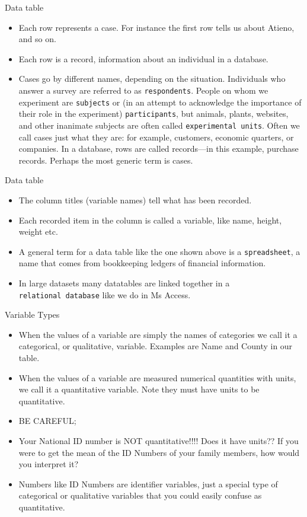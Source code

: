 \documentclass[
  ignorenonframetext,
]{beamer}
\begin{document}
\begin{frame}[fragile]{Data table}
\protect\hypertarget{data-table}{}
\begin{itemize}
\item
  Each row represents a case. For instance the first row tells us about
  Atieno, and so on.
\item
  Each row is a record, information about an individual in a database.
\item
  Cases go by different names, depending on the situation. Individuals
  who answer a survey are referred to as \texttt{respondents}. People on
  whom we experiment are \texttt{subjects} or (in an attempt to
  acknowledge the importance of their role in the experiment)
  \texttt{participants}, but animals, plants, websites, and other
  inanimate subjects are often called \texttt{experimental\ units}.
  Often we call cases just what they are: for example, customers,
  economic quarters, or companies. In a database, rows are called
  records---in this example, purchase records. Perhaps the most generic
  term is cases.
\end{itemize}
\end{frame}

\begin{frame}[fragile]{Data table}
\protect\hypertarget{data-table-1}{}
\begin{itemize}
\item
  The column titles (variable names) tell what has been recorded.
\item
  Each recorded item in the column is called a variable, like name,
  height, weight etc.
\item
  A general term for a data table like the one shown above is a
  \texttt{spreadsheet}, a name that comes from bookkeeping ledgers of
  financial information.
\item
  In large datasets many datatables are linked together in a
  \texttt{relational\ database} like we do in Ms Access.
\end{itemize}
\end{frame}

\begin{frame}{Variable Types}
\protect\hypertarget{variable-types}{}
\begin{itemize}
\item
  When the values of a variable are simply the names of categories we
  call it a categorical, or qualitative, variable. Examples are Name and
  County in our table.
\item
  When the values of a variable are measured numerical quantities with
  units, we call it a quantitative variable. Note they must have units
  to be quantitative.
\item
  BE CAREFUL;
\item
  Your National ID number is NOT quantitative!!!! Does it have units??
  If you were to get the mean of the ID Numbers of your family members,
  how would you interpret it?
\item
  Numbers like ID Numbers are identifier variables, just a special type
  of categorical or qualitative variables that you could easily confuse
  as quantitative.
\end{itemize}
\end{frame}
\end{document}

